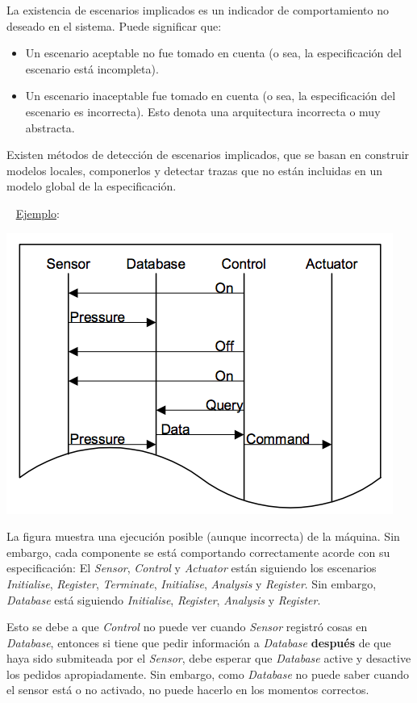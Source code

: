 \documentclass[]{article}
\begin{document}
La existencia de escenarios implicados es un indicador de comportamiento no deseado en el sistema. Puede significar que:
\begin{itemize}
	\item Un escenario aceptable no fue tomado en cuenta (o sea, la especificación del escenario está incompleta).
	\item Un escenario inaceptable fue tomado en cuenta (o sea, la especificación del escenario es incorrecta). Esto denota una arquitectura incorrecta o muy abstracta.
\end{itemize}

Existen métodos de detección de escenarios implicados, que se basan en construir modelos locales, componerlos y detectar trazas que no están incluidas en un modelo global de la especificación.

~\newline
\underline{Ejemplo}:
\begin{center}
	\includegraphics[scale=0.5]{Implicados.png}
\end{center}

La figura muestra una ejecución posible (aunque incorrecta) de la máquina. Sin embargo, cada componente se está comportando correctamente acorde con su especificación: El \textit{Sensor}, \textit{Control} y \textit{Actuator} están siguiendo los escenarios \textit{Initialise}, \textit{Register}, \textit{Terminate},  \textit{Initialise}, \textit{Analysis} y \textit{Register}. Sin embargo, \textit{Database} está siguiendo  \textit{Initialise}, \textit{Register}, \textit{Analysis} y \textit{Register}.

Esto se debe a que \textit{Control} no puede ver cuando \textit{Sensor} registró cosas en \textit{Database}, entonces si tiene que pedir información a \textit{Database} \textbf{después} de que haya sido submiteada por el \textit{Sensor}, debe esperar que \textit{Database} active y desactive los pedidos apropiadamente. Sin embargo, como \textit{Database} no puede saber cuando el sensor está o no activado, no puede hacerlo en los momentos correctos.
\end{document}

